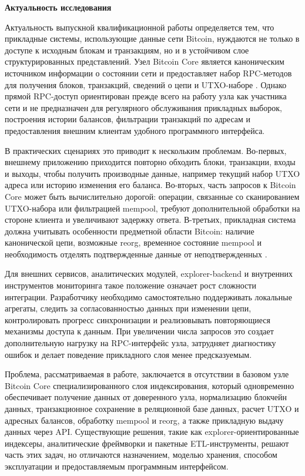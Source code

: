 \introduction %

\textbf{Актуальность исследования}

Актуальность выпускной квалификационной работы определяется тем, что
прикладные системы, использующие данные сети Bitcoin, нуждаются не только в
доступе к исходным блокам и транзакциям, но и в устойчивом слое
структурированных представлений. Узел Bitcoin Core является каноническим
источником информации о состоянии сети и предоставляет набор RPC-методов для
получения блоков, транзакций, сведений о цепи и UTXO-наборе
\cite{btc_core_rpc, bitcoin_core_rpc_29}. Однако прямой RPC-доступ ориентирован
прежде всего на работу узла как участника сети и не предназначен для
регулярного обслуживания прикладных выборок, построения истории балансов,
фильтрации транзакций по адресам и предоставления внешним клиентам удобного
программного интерфейса.

В практических сценариях это приводит к нескольким проблемам. Во-первых,
внешнему приложению приходится повторно обходить блоки, транзакции, входы и
выходы, чтобы получить производные данные, например текущий набор UTXO адреса
или историю изменения его баланса. Во-вторых, часть запросов к Bitcoin Core
может быть вычислительно дорогой: операции, связанные со сканированием
UTXO-набора или фильтрацией mempool, требуют дополнительной обработки на
стороне клиента и увеличивают задержку ответа. В-третьих, прикладная система
должна учитывать особенности предметной области Bitcoin: наличие канонической
цепи, возможные reorg, временное состояние mempool и необходимость отделять
подтвержденные данные от неподтвержденных \cite{nakamoto2008,
narayanan2016bitcoin, antonopoulos2017mastering}.

Для внешних сервисов, аналитических модулей, explorer-backend и внутренних
инструментов мониторинга такое положение означает рост сложности интеграции.
Разработчику необходимо самостоятельно поддерживать локальные агрегаты,
следить за согласованностью данных при изменении цепи, контролировать прогресс
синхронизации и реализовывать повторяющиеся механизмы доступа к данным. При
увеличении числа запросов это создает дополнительную нагрузку на RPC-интерфейс
узла, затрудняет диагностику ошибок и делает поведение прикладного слоя менее
предсказуемым.

Проблема, рассматриваемая в работе, заключается в отсутствии в базовом узле
Bitcoin Core специализированного слоя индексирования, который одновременно
обеспечивает получение данных от доверенного узла, нормализацию блокчейн
данных, транзакционное сохранение в реляционной базе данных, расчет UTXO и
адресных балансов, обработку mempool и reorg, а также прикладную выдачу данных
через API. Существующие решения, такие как explorer-ориентированные индексеры,
аналитические фреймворки и пакетные ETL-инструменты, решают часть этих задач,
но отличаются назначением, моделью хранения, способом эксплуатации и
предоставляемым программным интерфейсом.


